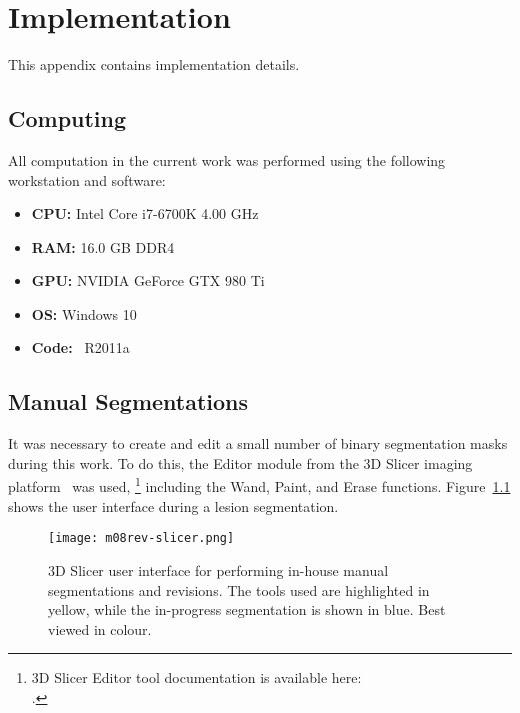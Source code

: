 \chapter{Implementation}
This appendix contains implementation details.
\section{Computing}
All computation in the current work was performed using the following workstation and software:
\begin{itemize}[topsep=0pt,itemsep=-6pt]
  \item \textbf{CPU:} Intel Core i7-6700K 4.00 GHz
  \item \textbf{RAM:} 16.0 GB DDR4
  \item \textbf{GPU:} NVIDIA GeForce GTX 980 Ti
  \item \textbf{OS:} Windows 10
  \item \textbf{Code:} \matlab\ R2011a
\end{itemize}
\section{Manual Segmentations}
It was necessary to create and edit a small number of binary segmentation masks during this work.
To do this, the Editor module from the 3D Slicer imaging platform~\cite{Fedorov2012} was used,%
\footnote{3D Slicer Editor tool documentation is available here:\\
  .}
including the Wand, Paint, and Erase functions.
Figure~\ref{fig:m08-rev-slicer} shows the user interface during a lesion segmentation.
\begin{figure}[ht]
  \centering
  \texttt{[image: m08rev-slicer.png]}
  \caption{3D Slicer user interface for performing in-house manual segmentations and revisions.
    The tools used are highlighted in yellow, while the in-progress segmentation is shown in blue.
    Best viewed in colour.}%
  \label{fig:m08-rev-slicer}
\end{figure}
